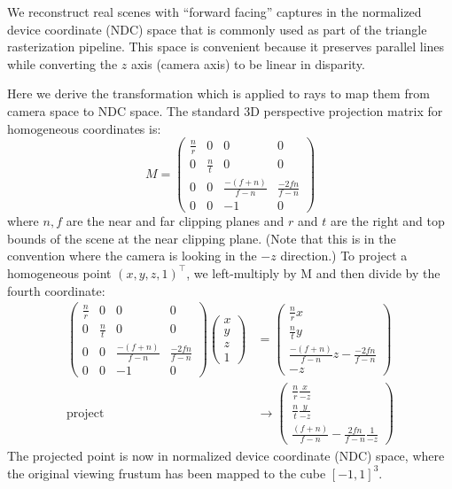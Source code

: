 We reconstruct real scenes with ``forward facing'' captures in the normalized device coordinate (NDC) space that is commonly used as part of the triangle rasterization pipeline. This space is convenient because it preserves parallel lines while converting the $z$ axis (camera axis) to be linear in disparity.

Here we derive the transformation which is applied to rays to map them from camera space to NDC space. The standard 3D perspective projection matrix for homogeneous coordinates is:
\begin{equation}
    M = \begin{pmatrix}
     \frac{n}{r} & 0 & 0 & 0 \\
     0 & \frac{n}{t} & 0 & 0 \\
     0 & 0 & \frac{-(f+n)}{f-n} & \frac{-2fn}{f-n} \\
     0 & 0 & -1 & 0 
    \end{pmatrix}
\end{equation}
where $n, f$ are the near and far clipping planes and $r$ and $t$ are the right and top bounds of the scene at the near clipping plane. (Note that this is in the convention where the camera is looking in the $-z$ direction.) To project a homogeneous point $(x,y,z,1)^\top$, we left-multiply by M and then divide by the fourth coordinate:
\begin{align}
    \begin{pmatrix}
     \frac{n}{r} & 0 & 0 & 0 \\
     0 & \frac{n}{t} & 0 & 0 \\
     0 & 0 & \frac{-(f+n)}{f-n} & \frac{-2fn}{f-n} \\
     0 & 0 & -1 & 0 
    \end{pmatrix}
    \begin{pmatrix}
    x \\ y \\ z \\ 1
    \end{pmatrix}
    &=
    \begin{pmatrix}
    \frac{n}{r} x \\
    \frac{n}{t} y \\
    \frac{-(f+n)}{f-n} z - \frac{-2fn}{f-n} \\
    -z
    \end{pmatrix} \\
    \textrm{project}
    &\rightarrow
    \begin{pmatrix}
    \frac{n}{r} \frac{x}{-z} \\
    \frac{n}{t} \frac{y}{-z} \\
    \frac{(f+n)}{f-n} - \frac{2fn}{f-n} \frac{1}{-z}
    \end{pmatrix}
    \label{eq:projpt}
\end{align}
The projected point is now in normalized device coordinate (NDC) space, where the original viewing frustum has been mapped to the cube $[-1,1]^3$. 

